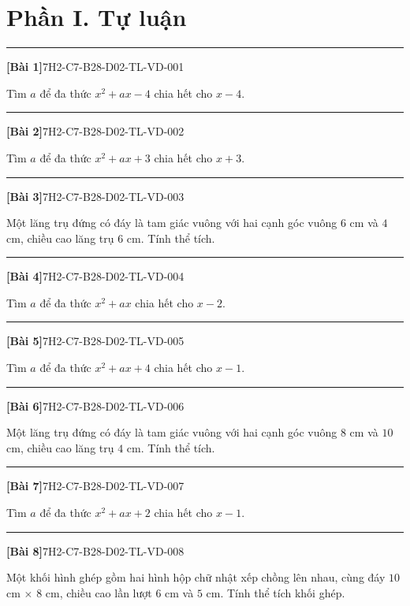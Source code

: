 \documentclass[12pt,a4paper]{article}
\newif\ifloigiai
\newenvironment{cauhoi}[2]{%
  \par\medskip\noindent\rule{\textwidth}{0.4pt}\par\nopagebreak
  \noindent\textbf{[#1]}\hfill{\scriptsize\ttfamily #2}\par\nopagebreak\smallskip}{\par}
\newcommand{\loigiai}[1]{\ifloigiai\par\smallskip\noindent\textit{Lời giải.} #1\par\fi}
\begin{document}
\section*{Phần I. Tự luận}
\begin{cauhoi}{Bài 1}{7H2-C7-B28-D02-TL-VD-001}
Tìm $a$ để đa thức $x^{2}+ax-4$ chia hết cho $x-4$.
\loigiai{Đa thức chia hết cho $x-4$ khi $x=4$ là nghiệm: $16+4a-4=0$, suy ra $a=-3$.}
\end{cauhoi}
\begin{cauhoi}{Bài 2}{7H2-C7-B28-D02-TL-VD-002}
Tìm $a$ để đa thức $x^{2}+ax+3$ chia hết cho $x+3$.
\loigiai{Đa thức chia hết cho $x+3$ khi $x=-3$ là nghiệm: $9-3a+3=0$, suy ra $a=4$.}
\end{cauhoi}
\begin{cauhoi}{Bài 3}{7H2-C7-B28-D02-TL-VD-003}
Một lăng trụ đứng có đáy là tam giác vuông với hai cạnh góc vuông $6$ cm và $4$ cm, chiều cao lăng trụ $6$ cm. Tính thể tích.
\loigiai{Diện tích đáy là $\dfrac{6\cdot 4}{2}=12$ ($\text{cm}^2$). Thể tích là $12\cdot 6=72$ ($\text{cm}^3$).}
\end{cauhoi}
\begin{cauhoi}{Bài 4}{7H2-C7-B28-D02-TL-VD-004}
Tìm $a$ để đa thức $x^{2}+ax$ chia hết cho $x-2$.
\loigiai{Đa thức chia hết cho $x-2$ khi $x=2$ là nghiệm: $4+2a=0$, suy ra $a=-2$.}
\end{cauhoi}
\begin{cauhoi}{Bài 5}{7H2-C7-B28-D02-TL-VD-005}
Tìm $a$ để đa thức $x^{2}+ax+4$ chia hết cho $x-1$.
\loigiai{Đa thức chia hết cho $x-1$ khi $x=1$ là nghiệm: $1+a+4=0$, suy ra $a=-5$.}
\end{cauhoi}
\begin{cauhoi}{Bài 6}{7H2-C7-B28-D02-TL-VD-006}
Một lăng trụ đứng có đáy là tam giác vuông với hai cạnh góc vuông $8$ cm và $10$ cm, chiều cao lăng trụ $4$ cm. Tính thể tích.
\loigiai{Diện tích đáy là $\dfrac{8\cdot 10}{2}=40$ ($\text{cm}^2$). Thể tích là $40\cdot 4=160$ ($\text{cm}^3$).}
\end{cauhoi}
\begin{cauhoi}{Bài 7}{7H2-C7-B28-D02-TL-VD-007}
Tìm $a$ để đa thức $x^{2}+ax+2$ chia hết cho $x-1$.
\loigiai{Đa thức chia hết cho $x-1$ khi $x=1$ là nghiệm: $1+a+2=0$, suy ra $a=-3$.}
\end{cauhoi}
\begin{cauhoi}{Bài 8}{7H2-C7-B28-D02-TL-VD-008}
Một khối hình ghép gồm hai hình hộp chữ nhật xếp chồng lên nhau, cùng đáy $10$ cm $\times$ $8$ cm, chiều cao lần lượt $6$ cm và $5$ cm. Tính thể tích khối ghép.
\loigiai{Thể tích hai khối là $10\cdot 8\cdot 6=480$ và $10\cdot 8\cdot 5=400$ ($\text{cm}^3$). Thể tích khối ghép là $480+400=880$ ($\text{cm}^3$).}
\end{cauhoi}
\end{document}
